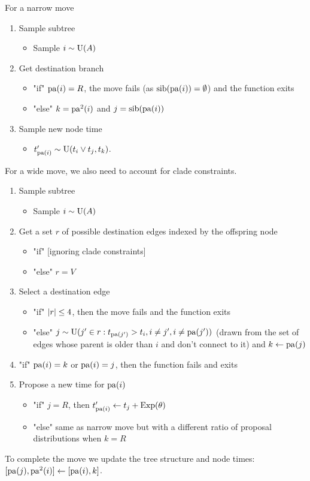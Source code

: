 \documentclass[11pt,a4paper]{article}
\begin{document}
For a narrow move
\begin{enumerate}
    \item Sample subtree
    \begin{itemize}
        \item Sample $ i \sim \mathrm{U}(A) $
    \end{itemize}
    \item Get destination branch
    \begin{itemize}
        \item "if" $ \operatorname*{\mathrm{pa}}(i) = R $, the move fails (as $ \operatorname*{\mathrm{sib}}(\operatorname*{\mathrm{pa}}(i)) = \emptyset $) and the function exits
        \item "else" $ k = \operatorname*{\mathrm{pa}}^2(i) $ and $ j = \operatorname*{\mathrm{sib}}(\operatorname*{\mathrm{pa}}(i)) $
    \end{itemize}
    \item Sample new node time
    \begin{itemize}
        \item $ t_{\operatorname*{\mathrm{pa}}(i)}' \sim \mathrm{U}(t_i \vee t_j, t_k) $.
    \end{itemize}
\end{enumerate}
For a wide move, we also need to account for clade constraints.
\begin{enumerate}
    \item Sample subtree
    \begin{itemize}
        \item Sample $ i \sim \mathrm{U}(A) $
    \end{itemize}
    \item Get a set $ r $ of possible destination edges indexed by the offspring node
        \begin{itemize}
            \item "if" [ignoring clade constraints]
            \item "else" $ r = V $
        \end{itemize}
    \item Select a destination edge
        \begin{itemize}
            \item "if" $ \lvert r\rvert \leq 4 $, then the move fails and the function exits
            \item "else" $ j \sim \mathrm{U}(j' \in r : t_{\operatorname*{\mathrm{pa}}(j')} > t_i, i \neq j', i \neq \operatorname*{\mathrm{pa}}(j')) $ (drawn from the set of edges whose parent is older than $ i $ and don't connect to it) and $ k \leftarrow \operatorname*{\mathrm{pa}}(j) $
        \end{itemize}
    \item "if" $ \operatorname*{\mathrm{pa}}(i) = k $ or $ \operatorname*{\mathrm{pa}}(i) = j $, then the function fails and exits
    \item Propose a new time for $ \operatorname*{\mathrm{pa}}(i) $
    \begin{itemize}
        \item "if" $ j = R $, then $ t_{\operatorname*{\mathrm{pa}}(i)}' \leftarrow t_j + \mathrm{Exp}(\theta) $
        \item "else" same as narrow move but with a different ratio of proposal distributions when $ k = R $
    \end{itemize}
\end{enumerate}
To complete the move we update the tree structure and node times: $ [\operatorname*{\mathrm{pa}}(j), \operatorname*{\mathrm{pa}}^2(i)] \leftarrow [\operatorname*{\mathrm{pa}}(i), k] $.
\end{document}
